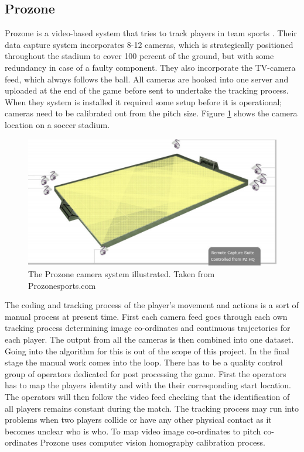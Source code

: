 \subsection{Prozone}

Prozone is a video-based system that tries to track players in team sports \cite{Prozone:indepth}. Their data capture system incorporates 8-12 cameras, which is strategically positioned throughout the stadium to cover 100 percent of the ground, but with some redundancy in case of a faulty component. They also incorporate the TV-camera feed, which always follows the ball. All cameras are hooked into one server and uploaded at the end of the game before sent to undertake the tracking process. When they system is installed it required some setup before it is operational; cameras need to be calibrated out from the pitch size. Figure \ref{fig:prozonecam} shows the camera location on a soccer stadium.

\begin{figure}[ht!]
\centering
\includegraphics[width=1\textwidth]{images/general/prozonecam.png}
\caption{The Prozone camera system illustrated. Taken from Prozonesports.com}
\label{fig:prozonecam}
\end{figure}

The coding and tracking process of the player's movement and actions is a sort of manual process at present time. First each camera feed goes through each own tracking process determining image co-ordinates and continuous trajectories for each player. The output from all the cameras is then combined into one dataset. Going into the algorithm for this is out of the scope of this project. In the final stage the manual work comes into the loop. There has to be a quality control group of operators dedicated for post processing the game. First the operators has to map the players identity and with the their corresponding start location. The operators will then follow the video feed checking that the identification of all players remains constant during the match. The tracking process may run into problems when two players collide or have any other physical contact as it becomes unclear who is who. To map video image co-ordinates to pitch co-ordinates Prozone uses computer vision homography calibration process.

